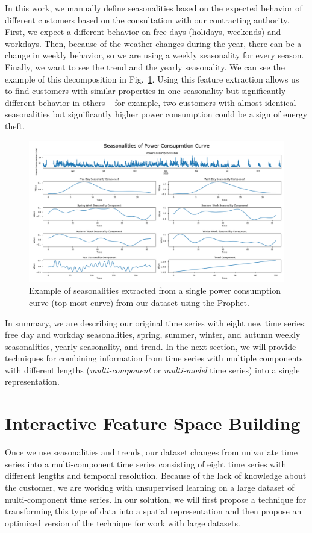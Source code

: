 In this work, we manually define seasonalities based on the expected behavior of different customers based on the consultation with our contracting authority. First, we expect a different behavior on free days (holidays, weekends) and workdays. Then, because of the weather changes during the year, there can be a change in weekly behavior, so we are using a weekly seasonality for every season. Finally, we want to see the trend and the yearly seasonality. We can see the example of this decomposition in Fig.~\ref{fig:seasonalities}. Using this feature extraction allows us to find customers with similar properties in one seasonality but significantly different behavior in others -- for example, two customers with almost identical seasonalities but significantly higher power consumption could be a sign of energy theft.
\begin{figure}[h]
    \centering
    \includegraphics[width=\textwidth]{img/seasonalities.png}
    \caption{Example of seasonalities extracted from a single power consumption curve (top-most curve) from our dataset using the Prophet.}
    \label{fig:seasonalities}
\end{figure}

In summary, we are describing our original time series with eight new time series: free day and workday seasonalities, spring, summer, winter, and autumn weekly seasonalities, yearly seasonality, and trend. In the next section, we will provide techniques for combining information from time series with multiple components with different lengths (\textit{multi-component} or \textit{multi-model} time series) into a single representation.

\section{Interactive Feature Space Building}
Once we use seasonalities and trends, our dataset changes from univariate time series into a multi-component time series consisting of eight time series with different lengths and temporal resolution. Because of the lack of knowledge about the customer, we are working with unsupervised learning on a large dataset of multi-component time series. In our solution, we will first propose a technique for transforming this type of data into a spatial representation and then propose an optimized version of the technique for work with large datasets.

